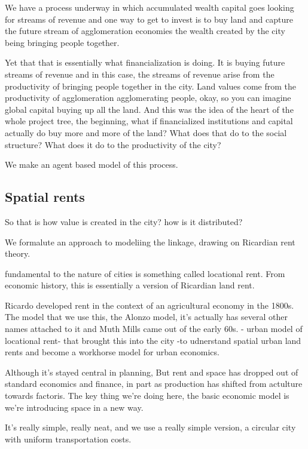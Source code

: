 We have a process underway in which accumulated wealth capital goes looking for streams of revenue and one way to get to invest is to buy land and capture the future stream of agglomeration economies the wealth created by the city being bringing people together.

Yet that that is essentially what financialization is doing. It is buying future streams of revenue and in this case, the streams of revenue arise from the productivity of bringing people together in the city. Land values come from the productivity of agglomeration agglomerating people, okay, so you can imagine global capital buying up all the land.
And this was the idea of the heart of the whole project tree, the beginning, what if financialized institutions and capital actually do buy more and more of the land? What does that do to the social structure? What does it do to the productivity of the city?

We make an agent based model of this process. 


\subsection{Spatial rents}

So that is how value is created in the city?  how is it distributed?

We formalute an approach to modeliing the linkage, 
 drawing on Ricardian rent theory.

fundamental to the nature of cities is something called locational rent. 
From economic history, this is essentially a version of Ricardian land rent.

Ricardo developed rent in the context of an agricultural economy in the 1800s. 
The model that we use this, the Alonzo model, it's actually has several other names attached to it and Muth Mills came out of the early 60s. - urban model of locational rent- that brought this into the city -to udnerstand spatial urban land rents and become a workhorse model for urban economics.

Although it's stayed central in planning,
But rent and space has dropped out of standard economics and finance, in part as production has shifted from actulture towards factoris.
The key thing we're doing here, the basic economic model is we're introducing space in a new way.


It's really simple, really neat, and we use a really simple version, a circular city with uniform transportation costs.

